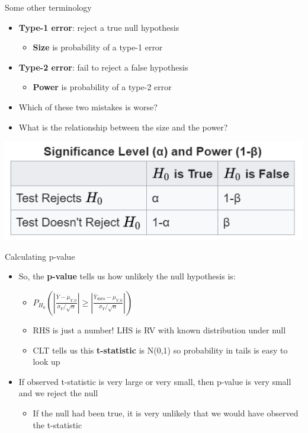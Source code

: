 \documentclass[aspectratio=169]{beamer}
\begin{document}
\begin{frame}{Some other terminology}
    \begin{itemize}
        \item \textbf{Type-1 error}: reject a true null hypothesis
        \begin{itemize}
            \item \textbf{Size} is probability of a type-1 error
        \end{itemize}
        \item \textbf{Type-2 error}: fail to reject a false hypothesis
        \begin{itemize}
            \item \textbf{Power} is probability of a type-2 error
        \end{itemize}
        \item Which of these two mistakes is worse?
        \item What is the relationship between the size and the power?
    \end{itemize}
\end{frame}

\begin{frame}
    \centering
    \includegraphics[width = .6\textwidth,keepaspectratio]{size_and_power.png}
\end{frame}

\begin{frame}{Calculating p-value}
    \begin{itemize}
        \item So, the \textbf{p-value} tells us how unlikely the null hypothesis is:
        \begin{itemize}
            \item  $P_{H_0}(|\frac{\bar{Y} - \mu_{Y,0}}{\sigma_Y/\sqrt{n}}|\geq |\frac{\bar{Y}_{data} - \mu_{Y,0}}{\sigma_Y/\sqrt{n}}|)$
            \item RHS is just a number! LHS is RV with known distribution under null
            \item CLT tells us this \textbf{t-statistic} is N(0,1) so probability in tails is easy to look up
        \end{itemize}
        \item If observed t-statistic is very large or very small, then p-value is very small and we reject the null
        \begin{itemize}
            \item If the null had been true, it is very unlikely that we would have observed the t-statistic
        \end{itemize}
    \end{itemize}
\end{frame}
\end{document}
